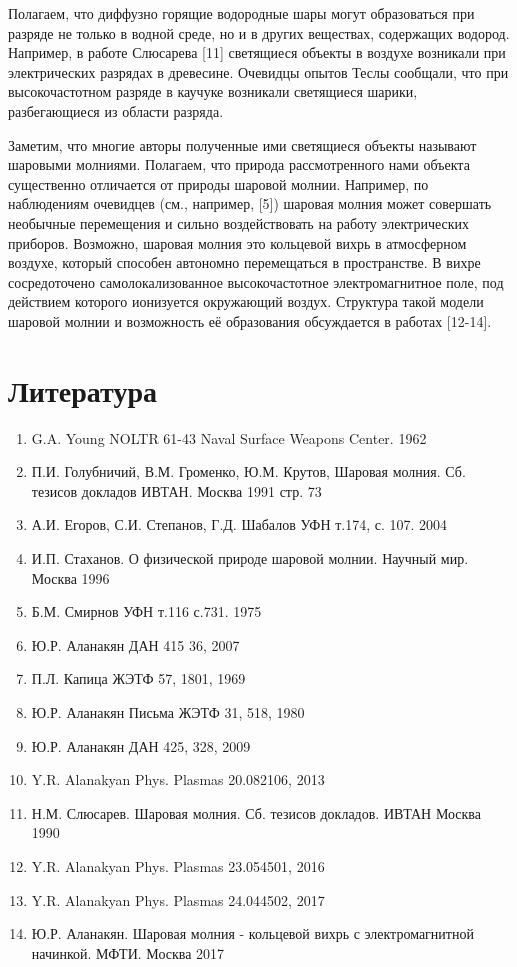 \documentclass[a4paper]{article}
\begin{document}
Полагаем, что диффузно горящие водородные шары могут образоваться при разряде не только в водной среде, но и в других веществах, содержащих водород. Например, в работе Слюсарева [11] светящиеся объекты в воздухе возникали при электрических разрядах в древесине. Очевидцы опытов Теслы сообщали, что при высокочастотном разряде в каучуке возникали светящиеся шарики, разбегающиеся из области разряда.

Заметим, что многие авторы полученные ими светящиеся объекты называют шаровыми молниями. Полагаем, что природа рассмотренного нами объекта существенно отличается от природы шаровой молнии. Например, по наблюдениям очевидцев (см., например, [5]) шаровая молния может совершать необычные перемещения и сильно воздействовать на работу электрических приборов. Возможно, шаровая молния это кольцевой вихрь в атмосферном воздухе, который способен автономно перемещаться в пространстве. В вихре сосредоточено самолокализованное высокочастотное электромагнитное поле, под действием которого ионизуется окружающий воздух. Структура такой модели шаровой молнии и возможность её образования обсуждается в работах [12-14]. 

\newpage
\section{Литература}
\begin{enumerate}
    \item G.A. Young NOLTR 61-43 Naval Surface Weapons Center. 1962
    \item П.И. Голубничий, В.М. Громенко, Ю.М. Крутов, Шаровая молния. Сб. тезисов докладов ИВТАН. Москва 1991 стр. 73
    \item А.И. Егоров, С.И. Степанов, Г.Д. Шабалов УФН т.174, с. 107. 2004
    \item И.П. Стаханов. О физической природе шаровой молнии. Научный мир. Москва 1996
    \item Б.М. Смирнов УФН т.116 с.731. 1975
    \item Ю.Р. Аланакян ДАН 415 36, 2007
    \item П.Л. Капица ЖЭТФ 57, 1801, 1969
    \item Ю.Р. Аланакян Письма ЖЭТФ 31, 518, 1980
    \item Ю.Р. Аланакян ДАН 425, 328, 2009
    \item Y.R. Alanakyan Phys. Plasmas 20.082106, 2013
    \item Н.М. Слюсарев. Шаровая молния. Сб. тезисов докладов. ИВТАН Москва 1990
    \item Y.R. Alanakyan Phys. Plasmas 23.054501, 2016
    \item Y.R. Alanakyan Phys. Plasmas 24.044502, 2017
    \item Ю.Р. Аланакян. Шаровая молния - кольцевой вихрь с электромагнитной начинкой. МФТИ. Москва 2017
    
    
\end{enumerate}

 
\end{document}
